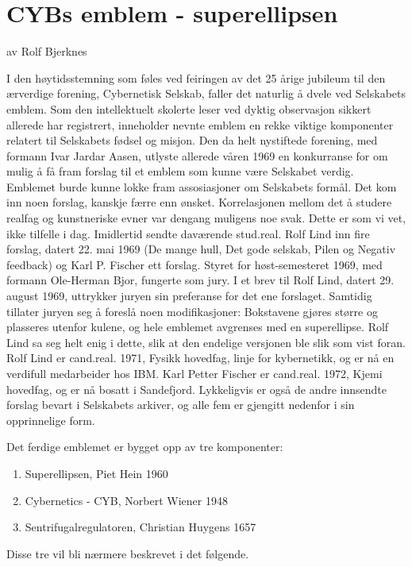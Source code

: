 \documentclass[../../main.tex]{subfiles}
\begin{document}
\chapter{CYBs emblem - superellipsen}

av Rolf Bjerknes

I den høytidsstemning som føles ved feiringen av det 25 årige jubileum til den ærverdige forening, Cybernetisk Selskab, faller det naturlig å dvele ved Selskabets emblem. Som den intellektuelt skolerte leser ved dyktig observasjon sikkert allerede har registrert, inneholder nevnte emblem en rekke viktige komponenter relatert til Selskabets fødsel og misjon. Den da helt nystiftede forening, med formann Ivar Jardar Aasen, utlyste allerede våren 1969 en konkurranse for om mulig å få fram forslag til et emblem som kunne være Selskabet verdig. Emblemet burde kunne lokke fram assosiasjoner om Selskabets formål. Det kom inn noen forslag, kanskje færre enn ønsket. Korrelasjonen mellom det å studere realfag og kunstneriske evner var dengang muligens noe svak. Dette er som vi vet, ikke tilfelle i dag. Imidlertid sendte daværende stud.real. Rolf Lind inn fire forslag, datert 22. mai 1969 (De mange hull, Det gode selskab, Pilen og Negativ feedback) og Karl P. Fischer ett forslag. Styret for høst-semesteret 1969, med formann Ole-Herman Bjor, fungerte som jury. I et brev til Rolf Lind, datert 29. august 1969, uttrykker juryen sin preferanse for det ene forslaget. Samtidig tillater juryen seg å foreslå noen modifikasjoner: Bokstavene gjøres større og plasseres utenfor kulene, og hele emblemet avgrenses med en superellipse. Rolf Lind sa seg helt enig i dette, slik at den endelige versjonen ble slik som vist foran. Rolf Lind er cand.real. 1971, Fysikk hovedfag, linje for kybernetikk, og er nå en verdifull medarbeider hos IBM. Karl Petter Fischer er cand.real. 1972, Kjemi hovedfag, og er nå bosatt i Sandefjord. Lykkeligvis er også de andre innsendte forslag bevart i Selskabets arkiver, og alle fem er gjengitt nedenfor i sin opprinnelige form.

Det ferdige emblemet er bygget opp av tre komponenter:

\begin{enumerate}
\item Superellipsen, Piet Hein 1960
\item Cybernetics - CYB, Norbert Wiener 1948
\item Sentrifugalregulatoren, Christian Huygens 1657
\end{enumerate}

Disse tre vil bli nærmere beskrevet i det følgende.
\end{document}
